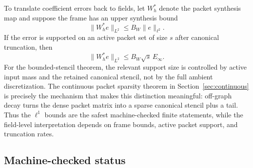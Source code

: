 To translate coefficient errors back to fields, let $W_h^\ast$ denote the packet synthesis map and suppose the frame has an upper synthesis bound
\[
\|W_h^\ast e\|_{L^2}\le B_W\|e\|_{\ell^2}.
\]
If the error is supported on an active packet set of size $s$ after canonical truncation, then
\[
\|W_h^\ast e\|_{L^2}
\le
B_W\sqrt{s}\,E_\infty.
\]
For the bounded-stencil theorem, the relevant support size is controlled by active input mass and the retained canonical stencil, not by the full ambient discretization. The continuous packet sparsity theorem in Section~\ref{sec:continuous} is precisely the mechanism that makes this distinction meaningful: off-graph decay turns the dense packet matrix into a sparse canonical stencil plus a tail. Thus the $\ell^1$ bounds are the safest machine-checked finite statements, while the field-level interpretation depends on frame bounds, active packet support, and truncation rates.

\subsection{Machine-checked status}

